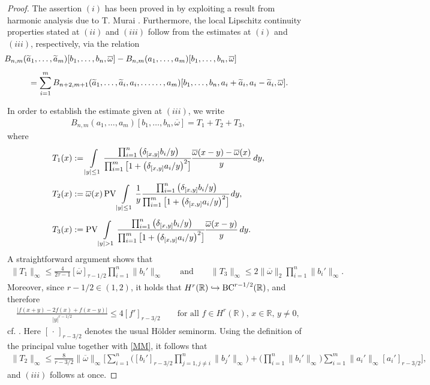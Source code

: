 \documentclass[11pt,reqno]{amsart}
\numberwithin{equation}{section}
\newcommand{\PV}{\mathop{\rm PV}\nolimits}
\newcommand{\0}{\Omega}
\newcommand{\wt}{\widetilde}
\newcommand{\ov}{\overline}
\newcommand{\oo}{\ov\omega}
\newcommand{\R}{\mathbb{R}}
\numberwithin{equation}{section}
\begin{document}
\begin{proof}
 The assertion $(i)$ has been proved in \cite[Remark~3.3]{M16x} by exploiting a result from harmonic analysis due to T. Murai \cite{TM86}. 
 Furthermore, the local Lipschitz continuity properties stated at $(ii)$ and $(iii)$ follow  from the  estimates at $(i)$ and $(iii)$, respectively, via the relation
 \begin{align}
 &\hspace{-1cm}B_{n,m}(\wt a_{1}, \ldots, \wt a_{m})[b_1,\ldots, b_{n},\oo]-  B_{n,m}(a_1, \ldots, a_{m})[b_1,\ldots, b_{n},\oo]\nonumber\\[1ex]
 &=\sum_{i=1}^{m} B_{n+2,m+1}(\wt a_{1},\ldots, \wt a_{i},a_i,\ldots \ldots, a_{m})[b_1,\ldots, b_{n},a_i+\wt a_{i}, a_i-\wt a_{i},\oo ].\label{rell}
\end{align}

In order to establish the estimate given  at $(iii)$, we write  
\begin{align*}
 B_{n,m}(a_1,\ldots, a_{m})[b_1,\ldots, b_n,\oo]= T_1+T_2+T_3,
\end{align*}
where
\begin{align*}
T_1 (x)&:=\int\limits_{|y|\leq 1} \cfrac{\prod_{i=1}^{n}\big(\delta_{[x,y]} b_i /y\big)}{\prod_{i=1}^{m}\big[1+\big(\delta_{[x,y]}  a_i /y\big)^2\big]} \frac{\oo(x-y)-\oo(x)}{y}\, dy,\\[1ex]
 T_2(x)&:= \oo(x)\PV\int\limits_{|y|\leq 1} \frac{1}{y}\cfrac{\prod_{i=1}^{n}\big(\delta_{[x,y]} b_i /y\big)}{\prod_{i=1}^{m}\big[1+\big(\delta_{[x,y]}  a_i /y\big)^2\big]}\, dy,\\[1ex]
 T_3(x)&:= \PV\int\limits_{|y|> 1}\cfrac{\prod_{i=1}^{n}\big(\delta_{[x,y]} b_i /y\big)}{\prod_{i=1}^{m}\big[1+\big(\delta_{[x,y]}  a_i /y\big)^2\big]} \frac{\oo(x-y)}{y}\, dy.
\end{align*}
A straightforward argument shows that 
\begin{align*}
 \|T_1\|_\infty\leq \frac{4}{2\tau-1}[\oo]_{\tau-1/2}\prod_{i=1}^{n}\|b_i'\|_\infty  \qquad \text{and}\qquad \|T_3\|_\infty\leq 2\|\oo\|_2\prod_{i=1}^{n}\|b_i'\|_\infty.
\end{align*}
Moreover, since $r-1/2\in (1,2)$,   it holds that $H^r(\R)\hookrightarrow {\rm BC}^{r-1/2}(\R) $,  and therefore
 \begin{align}\label{MM}
  \frac{|f(x+y)-2f(x)+f(x-y)|}{|y|^{r-1/2}}\leq 4[f']_{r-3/2} \qquad\text{for all $f\in H^r(\R)$, $x\in\R$, $y\neq0,$}
\end{align}
cf. \cite[Relation (0.2.2)]{L95}. Here $[\,\cdot\,]_{r-3/2}$ denotes the usual H\"older seminorm.  
Using the definition of the principal value together with \eqref{MM}, it follows that  
\begin{align*}
\|T_2\|_\infty\leq \frac{8}{r-3/2}\|\oo\|_\infty    \Big[\sum_{i=1}^{n} \Big([b_i']_{r-3/2}\prod_{{j=1, j\neq i}}^{n}\|b_j'\|_\infty\Big)+ \Big(\prod_{i=1}^{n}\|b_i'\|_\infty\Big)\sum_{i=1}^{m}\|a_i'\|_\infty[a_i']_{r-3/2}\Big],
\end{align*}
and  $(iii)$ follows at once.
\end{proof}
\end{document}
